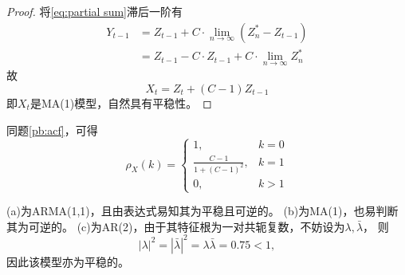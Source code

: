 \documentclass[cn]{homework}
\begin{document}
\begin{subproblem}[(\alph*)]
        \item
        \begin{proof}
            将\cref{eq:partial sum}滞后一阶有
            \[\begin{aligned}
                Y_{t-1}&=Z_{t-1}+C\cdot\lim_{n\to\infty}(Z^*_n-Z_{t-1})\\
                    &=Z_{t-1}-C\cdot Z_{t-1}+C\cdot\lim_{n\to\infty}Z^*_n
            \end{aligned}\]
            故
            \[X_t=Z_t+(C-1)Z_{t-1}\]
            即$X_t$是MA(1)模型，自然具有平稳性。
        \end{proof}

        \item
        同题\ref{pb:acf}，可得
        \[\rho_X(k)=\begin{cases}
            1,&k=0\\
            \frac{C-1}{1+(C-1)^2},&k=1\\
            0,&k>1
        \end{cases}\]
    \end{subproblem}

    \problem
    (a)为ARMA(1,1)，且由表达式易知其为平稳且可逆的。
    (b)为MA(1)，也易判断其为可逆的。
    (c)为AR(2)，由于其特征根为一对共轭复数，不妨设为$\lambda,\bar\lambda$，
    则
    \[|\lambda|^2=|\bar\lambda|^2=\lambda\bar\lambda=0.75<1,\]
    因此该模型亦为平稳的。
\end{document}

